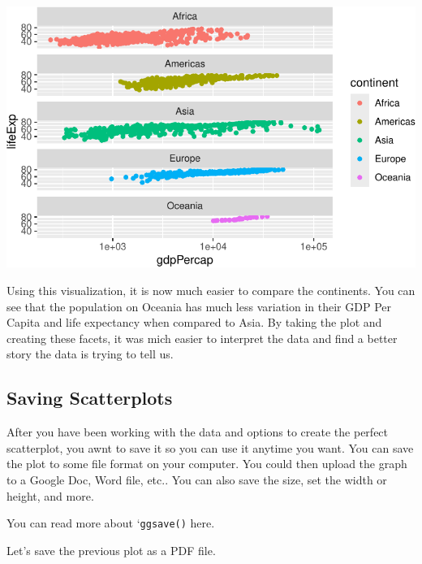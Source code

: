 \documentclass[
  letterpaper,
  DIV=11,
  numbers=noendperiod]{scrreprt}
\begin{document}
\includegraphics{Advanced_Scatterplot_Techniques_files/figure-pdf/unnamed-chunk-18-1.pdf}

Using this visualization, it is now much easier to compare the
continents. You can see that the population on Oceania has much less
variation in their GDP Per Capita and life expectancy when compared to
Asia. By taking the plot and creating these facets, it was mich easier
to interpret the data and find a better story the data is trying to tell
us.

\subsection*{Saving Scatterplots}\label{saving-scatterplots}

After you have been working with the data and options to create the
perfect scatterplot, you awnt to save it so you can use it anytime you
want. You can save the plot to some file format on your computer. You
could then upload the graph to a Google Doc, Word file, etc.. You can
also save the size, set the width or height, and more.

You can read more about `\texttt{ggsave()} here.

Let's save the previous plot as a PDF file.
\end{document}
